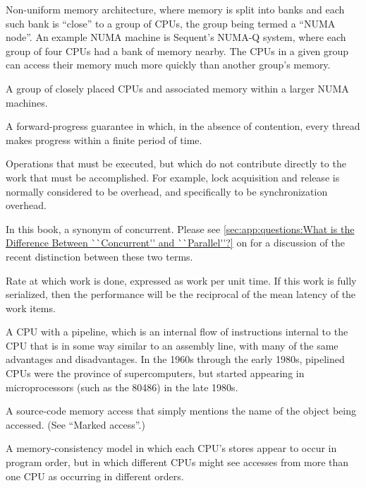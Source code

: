 \begin{description}
	Non-uniform memory architecture, where memory is split into
	banks and each such bank is ``close'' to a group of CPUs,
	the group being termed a ``NUMA node''.
	An example NUMA machine is Sequent's NUMA-Q system, where
	each group of four CPUs had a bank of memory nearby.
	The CPUs in a given group can access their memory much
	more quickly than another group's memory.
\item[\IXGaltr{NUMA Node}{NUMA node}:]
	A group of closely placed CPUs and associated memory within
	a larger NUMA machines.
\item[\IXG{Obstruction Free}:]
	A forward-progress guarantee in which, in the absence of
	contention, every thread makes progress within a finite
	period of time.
\item[\IXG{Overhead}:]
	Operations that must be executed, but which do not contribute
	directly to the work that must be accomplished.
	For example, lock acquisition and release is normally considered
	to be overhead, and specifically to be synchronization overhead.
\item[\IXG{Parallel}:]
	In this book, a synonym of concurrent.
	Please see \cref{sec:app:questions:What is the Difference Between ``Concurrent'' and ``Parallel''?}
	on 
	for a discussion of the recent distinction between these two
	terms.
\item[\IXG{Performance}:]
	Rate at which work is done, expressed as work per unit time.
	If this work is fully serialized, then the performance will
	be the reciprocal of the mean latency of the work items.
\item[\IXGr{Pipelined CPU}:]
	A CPU with a pipeline, which is
	an internal flow of instructions internal to the CPU that
	is in some way similar to an assembly line, with many of
	the same advantages and disadvantages.
	In the 1960s through the early 1980s, pipelined CPUs were the
	province of supercomputers, but started appearing in microprocessors
	(such as the 80486) in the late 1980s.
\item[\IXG{Plain Access}:]
	A source-code memory access that simply mentions the name of
	the object being accessed.
	(See ``Marked access''.)
\item[\IXGalth{Process Consistency}{process}{memory consistency}:]
	A memory-consistency model in which each CPU's stores appear to
	occur in program order, but in which different CPUs might see
	accesses from more than one CPU as occurring in different orders.
\item[\IXG{Program Order}:]

\end{description}
